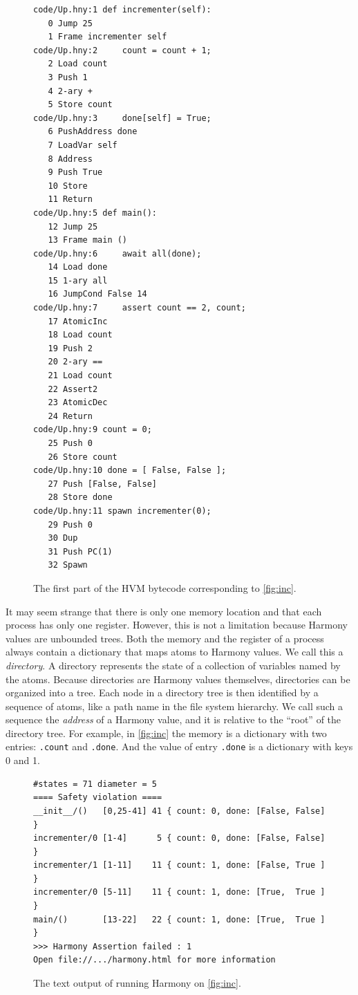 \documentclass{report}
\newenvironment{code}{
\tcolorbox
}{
\endtcolorbox
}
\begin{document}
\begin{figure}
\begin{code}
\begin{verbatim}
code/Up.hny:1 def incrementer(self):
   0 Jump 25
   1 Frame incrementer self
code/Up.hny:2     count = count + 1;
   2 Load count
   3 Push 1
   4 2-ary +
   5 Store count
code/Up.hny:3     done[self] = True;
   6 PushAddress done
   7 LoadVar self
   8 Address
   9 Push True
   10 Store
   11 Return
code/Up.hny:5 def main():
   12 Jump 25
   13 Frame main ()
code/Up.hny:6     await all(done);
   14 Load done
   15 1-ary all
   16 JumpCond False 14
code/Up.hny:7     assert count == 2, count;
   17 AtomicInc
   18 Load count
   19 Push 2
   20 2-ary ==
   21 Load count
   22 Assert2
   23 AtomicDec
   24 Return
code/Up.hny:9 count = 0;
   25 Push 0
   26 Store count
code/Up.hny:10 done = [ False, False ];
   27 Push [False, False]
   28 Store done
code/Up.hny:11 spawn incrementer(0);
   29 Push 0
   30 Dup
   31 Push PC(1)
   32 Spawn
\end{verbatim}
\end{code}
\caption{The first part of the HVM bytecode corresponding to \autoref{fig:inc}.}
\label{fig:inccode}
\end{figure}

It may seem strange that there is only one memory location and that each
process has only one register.  However, this is not a limitation because
Harmony values are unbounded trees.
Both the memory and the register of a process always contain
a dictionary that maps atoms to Harmony values.  We call this a \emph{directory}.
%
A directory represents the state of a collection of variables named by the atoms.
%
Because directories are Harmony values themselves,
directories can be organized into a tree.
Each node in a directory tree is then identified
by a sequence of atoms, like a path name in the file system hierarchy.  We call
such a sequence the \emph{address}
%
of a Harmony value, and it is relative to the
``root'' of the directory tree.
For example, in \autoref{fig:inc} the memory is a dictionary with two
entries: \texttt{.count} and \texttt{.done}.  And the value of entry
\texttt{.done} is a dictionary with keys 0 and 1.

\begin{figure}
\begin{code}
\begin{verbatim}
#states = 71 diameter = 5
==== Safety violation ====
__init__/()   [0,25-41] 41 { count: 0, done: [False, False] }
incrementer/0 [1-4]      5 { count: 0, done: [False, False] }
incrementer/1 [1-11]    11 { count: 1, done: [False, True ] }
incrementer/0 [5-11]    11 { count: 1, done: [True,  True ] }
main/()       [13-22]   22 { count: 1, done: [True,  True ] }
>>> Harmony Assertion failed : 1
Open file://.../harmony.html for more information
\end{verbatim}
\end{code}
\caption{The text output of running Harmony on \autoref{fig:inc}.}
\label{fig:incoutput}
\end{figure}
\end{document}
